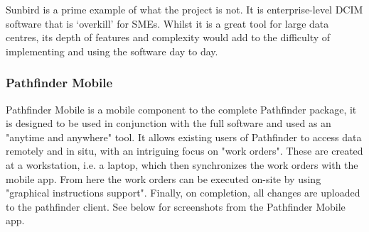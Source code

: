 \documentclass [11pt,a4paper]{article}
\begin{document}

Sunbird is a prime example of what the project is not. It is enterprise-level DCIM software that is `overkill' for SMEs. Whilst it is a great tool for large data centres, its depth of features and complexity would add to the difficulty of implementing and using the software day to day.

\subsubsection{Pathfinder Mobile}
\label{sec:pathfinder}

Pathfinder Mobile is a mobile component to the complete Pathfinder package, it is designed to be used in conjunction with the full software and used as an "anytime and anywhere" \cite{PathfinderMobile} tool. It allows existing users of Pathfinder to access data remotely and in situ, with an intriguing focus on "work orders". These are created at a workstation, i.e. a laptop, which then synchronizes the work orders with the mobile app. From here the work orders can be executed on-site by using "graphical instructions support"\cite{Pathfinder}. Finally, on completion, all changes are uploaded to the pathfinder client. See below for screenshots from the Pathfinder Mobile app. 
\end{document}
